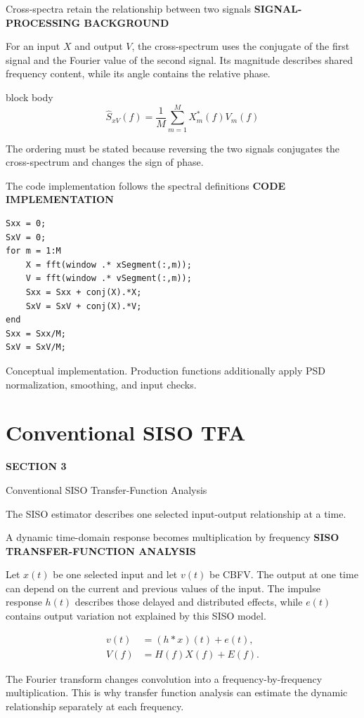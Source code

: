 \documentclass[aspectratio=169,11pt]{beamer}
\newcommand{\sectionlabel}[1]{%
  {\color{Accent}\fontsize{8}{9.5}\selectfont\bfseries\MakeUppercase{#1}}\par\vspace{0.12cm}}
\newcommand{\sourcefooter}[1]{%
  \par\vfill{\color{Muted}\fontsize{6.8}{8}\selectfont #1}}
\newenvironment{equationcallout}
  {\begin{beamercolorbox}[rounded=true,sep=0.28cm,center,wd=0.94\textwidth]{block body}%
   \setbeamercolor{block body}{bg=AccentLight,fg=Ink}\large}
  {\end{beamercolorbox}}
\newcommand{\sectionframe}[3]{%
  \begin{frame}[plain]
    \vspace{0.7cm}
    {\color{Accent}\fontsize{10}{12}\selectfont\bfseries SECTION #1}\par\vspace{0.45cm}
    {\color{Ink}\fontsize{24.5}{28}\selectfont #2}\par\vspace{0.55cm}
    {\color{Body}\fontsize{14.5}{19}\selectfont #3}
  \end{frame}}
\begin{document}
\begin{frame}{Cross-spectra retain the relationship between two signals}
\sectionlabel{Signal-Processing Background}
For an input $X$ and output $V$, the cross-spectrum uses the conjugate of the
first signal and the Fourier value of the second signal. Its magnitude describes
shared frequency content, while its angle contains the relative phase.

\vspace{0.35cm}
\begin{equationcallout}
\[
\widehat S_{xV}(f)
=\frac{1}{M}\sum_{m=1}^{M}X_m^*(f)V_m(f)
\]
\end{equationcallout}

\vspace{0.25cm}
The ordering must be stated because reversing the two signals conjugates the
cross-spectrum and changes the sign of phase.
\end{frame}

\begin{frame}[fragile]{The code implementation follows the spectral definitions}
\sectionlabel{Code Implementation}
\begin{lstlisting}[style=matlabslide]
Sxx = 0;
SxV = 0;
for m = 1:M
    X = fft(window .* xSegment(:,m));
    V = fft(window .* vSegment(:,m));
    Sxx = Sxx + conj(X).*X;
    SxV = SxV + conj(X).*V;
end
Sxx = Sxx/M;
SxV = SxV/M;
\end{lstlisting}
\sourcefooter{Conceptual implementation. Production functions additionally apply PSD normalization, smoothing, and input checks.}
\end{frame}


\section{Conventional SISO TFA}
\sectionframe{3}{Conventional SISO Transfer-Function Analysis}{%
The SISO estimator describes one selected input-output relationship at a time.}

\begin{frame}{A dynamic time-domain response becomes multiplication by frequency}
\sectionlabel{SISO Transfer-Function Analysis}
Let $x(t)$ be one selected input and let $v(t)$ be CBFV. The output at one time
can depend on the current and previous values of the input. The impulse response
$h(t)$ describes those delayed and distributed effects, while $e(t)$ contains
output variation not explained by this SISO model.

\vspace{0.30cm}
\begin{align*}
v(t)&=(h*x)(t)+e(t),\\[0.15cm]
V(f)&=H(f)X(f)+E(f).
\end{align*}

The Fourier transform changes convolution into a frequency-by-frequency
multiplication. This is why transfer function analysis can estimate the dynamic
relationship separately at each frequency.
\end{frame}
\end{document}
